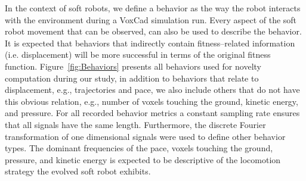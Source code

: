 \documentclass{sig-alternate}
\begin{document}
In the context of soft robots, we define a behavior as the way the robot interacts with the environment during a VoxCad simulation run. Every aspect of the soft robot movement that can be observed, can also be used to describe the behavior. 
It is expected that behaviors that indirectly contain fitness--related information (i.e. displacement) will be more successful in terms of the original fitness function. Figure~\ref{fig:Behaviors} presents all behaviors used for novelty computation during our study, in addition to behaviors that relate to displacement, e.g., trajectories and pace, we also include others that do not have this obvious relation, e.g., number of voxels touching the ground, kinetic energy, and pressure. For all recorded behavior metrics a constant sampling rate ensures that all signals have the same length. Furthermore, the discrete Fourier transformation of one dimensional signals were used to define other behavior types. The dominant frequencies of the pace, voxels touching the ground, pressure, and kinetic energy is expected to be descriptive of the locomotion strategy the evolved soft robot exhibits.
\end{document}
